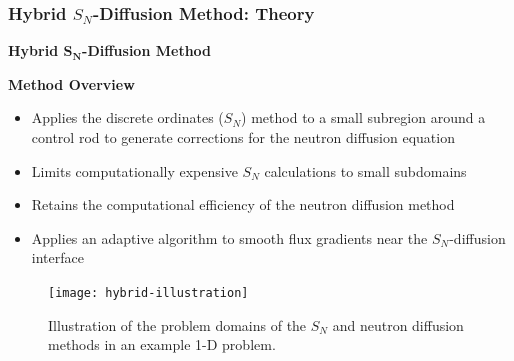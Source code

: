 \begin{frame}
  \frametitle{Hybrid $S_N$-Diffusion Method: Theory}
  \textbf{Hybrid $\bm{S_N}$-Diffusion Method}
  \begin{block}{\textbf{Method Overview}}
    \begin{itemize}
      \item Applies the discrete ordinates ($S_N$) method to a small subregion around a
        control rod to generate corrections for the neutron diffusion equation
      \item Limits computationally expensive $S_N$ calculations to small subdomains
      \item Retains the computational efficiency of the neutron diffusion method
      \item Applies an adaptive algorithm to smooth flux gradients near the $S_N$-diffusion interface
    \end{itemize}
  \end{block}
  \begin{figure}
    \centering
    \texttt{[image: hybrid-illustration]}
    \caption{Illustration of the problem domains of the $S_N$ and neutron diffusion methods in an
    example 1-D problem.}
  \end{figure}
\end{frame}


